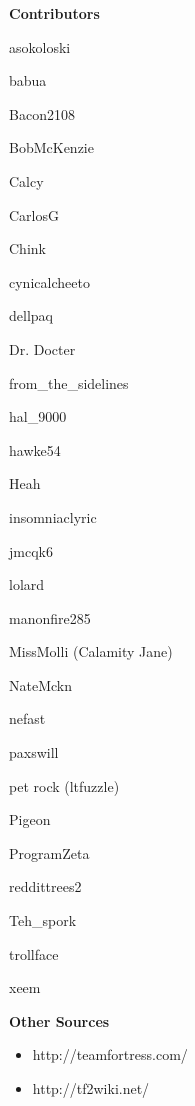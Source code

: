 {\bf Contributors}
\begin{packed_item}
\item asokoloski
\item babua
\item Bacon2108
\item BobMcKenzie
\item Calcy
\item CarlosG
\item Chink
\item cynicalcheeto
\item dellpaq
\item Dr. Docter
\item from\_the\_sidelines
\item hal\_9000
\item hawke54
\item Heah
\item insomniaclyric
\item jmcqk6
\item lolard
\item manonfire285
\item MissMolli (Calamity Jane)
\item NateMckn
\item nefast
\item paxswill
\item pet rock (ltfuzzle)
\item Pigeon
\item ProgramZeta
\item reddittrees2
\item Teh\_spork
\item trollface
\item xeem
\end{packed_item}


 
{\bf Other Sources}
\begin{itemize}
\item http://teamfortress.com/
\item http://tf2wiki.net/
\end{itemize}